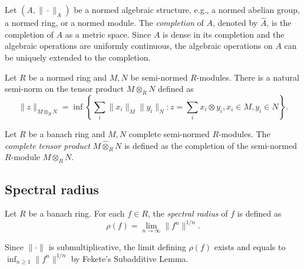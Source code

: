     \begin{definition}\label{def:completion_of_normed_algebraic_structures}
        Let \((A, \|\cdot\|_A)\) be a normed algebraic structure, e.g., a normed abelian group, a normed ring, or a normed module.
        The \emph{completion} of \(A\), denoted by \(\widehat{A}\), is the completion of \(A\) as a metric space.
        Since \(A\) is dense in its completion and the algebraic operations are uniformly continuous,
        the algebraic operations on \(A\) can be uniquely extended to the completion.
    \end{definition}
    
    Let \(R\) be a normed ring and \(M,N\) be semi-normed \(R\)-modules.
    There is a natural semi-norm on the tensor product \(M \otimes_R N\) defined as
    \[
        \|z\|_{M \otimes_R N} = \inf \left\{ \sum_{i} \|x_i\|_M \|y_i\|_N : z = \sum_i x_i \otimes y_i, x_i \in M, y_i \in N \right\}.
    \]

    \begin{definition}\label{def:complete_tensor_product}
        Let \(R\) be a banach ring and \(M,N\) complete semi-normed \(R\)-modules.
        The \emph{complete tensor product} \(M \widehat{\otimes}_R N\) is defined as the completion of the semi-normed \(R\)-module \(M \otimes_R N\).
    \end{definition}

    \begin{example}\label{eg:}
    \end{example}





\subsection{Spectral radius}

    \begin{definition}\label{def:spectral_radius_on_banach_rings}
        Let \(R\) be a banach ring.
        For each \(f \in R\), the \emph{spectral radius} of \(f\) is defined as
        \[
            \rho(f) = \lim_{n \to \infty} \|f^n\|^{1/n}.
        \]
    \end{definition}

    Since \(\|\cdot\|\) is submultiplicative, the limit defining \(\rho(f)\) exists and equals to \(\inf_{n \geq 1} \|f^n\|^{1/n}\) by Fekete's Subadditive Lemma.

